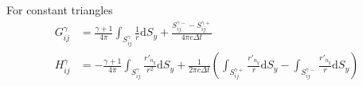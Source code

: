 \documentclass[a4paper,11pt,twoside]{article}
\newcommand{\td}{\mathrm{d}}
\begin{document}
For constant triangles
%
\begin{align}
G_{ij}^{\gamma}
&=
\frac{\gamma + 1}{4\pi}
\int_{S_{ij}^{\gamma}}
\frac{1}{r}
\td S_{y}
+
\frac{S_{ij}^{\gamma-} - S_{ij}^{\gamma+}}{4\pi c \Delta t}
\nonumber \\
H_{ij}^{\gamma}
&=
-
\frac{\gamma+1}{4\pi}
\int_{S_{ij}^{\gamma}}
\frac{r'_{n_{y}}}{r^2}
\td S_{y}
+
\frac{1}{2\pi c \Delta t}
\left(
\int_{S_{ij}^{\gamma+}}
\frac{r'_{n_{y}}}{r}
\td S_{y}
-
\int_{S_{ij}^{\gamma-}}
\frac{r'_{n_{y}}}{r}
\td S_{y}
\right)
\end{align}
\end{document}
